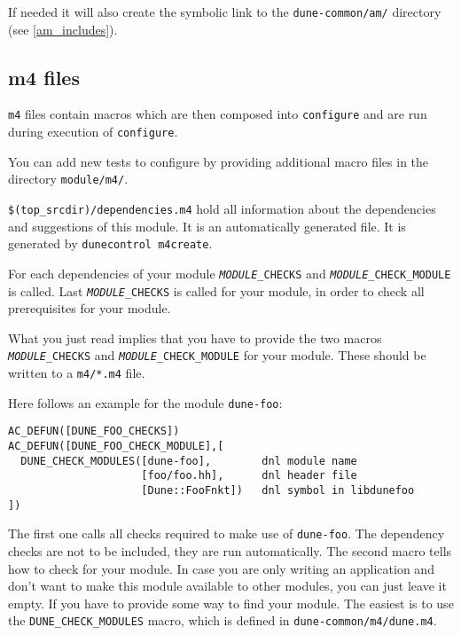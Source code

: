 \documentclass[11pt,a4paper,headinclude,footinclude,DIV16,normalheadings]{scrartcl}
\newcommand{\configure}{\texttt{configure}\xspace}
\newcommand{\topsrc}{\$(top\_srcdir)}
\begin{document}
If needed it will also create the symbolic link to the
\texttt{dune-common/am/} directory (see \ref{am_includes}).

\subsection{m4 files}
\label{m4files}

\texttt{m4} files contain macros which are then composed into
\configure and are run during execution of \configure.


You can add new tests to configure by providing additional macro files
in the directory \texttt{module/m4/}.


\texttt{\topsrc/dependencies.m4} hold all information about the
dependencies and suggestions of this module. It is an automatically
generated file. It is generated by \texttt{dunecontrol m4create}.

For each dependencies of your module \texttt{\emph{MODULE}\_CHECKS}
and \texttt{\emph{MODULE}\_CHECK\_MODULE} is called. Last
\texttt{\emph{MODULE}\_CHECKS} is called for your module, in order to
check all prerequisites for your module.

What you just read implies that you have to provide the two macros
\texttt{\emph{MODULE}\_CHECKS} and
\texttt{\emph{MODULE}\_CHECK\_MODULE} for your module. These should be
written to a \texttt{m4/*.m4} file.

Here follows an example for the module \texttt{dune-foo}:

\begin{lstlisting}
AC_DEFUN([DUNE_FOO_CHECKS])
AC_DEFUN([DUNE_FOO_CHECK_MODULE],[
  DUNE_CHECK_MODULES([dune-foo],        dnl module name
                     [foo/foo.hh],      dnl header file
                     [Dune::FooFnkt])   dnl symbol in libdunefoo
])
\end{lstlisting}

The first one calls all checks required to make use of
\texttt{dune-foo}. The dependency checks are not to be included, they
are run automatically. The second macro tells how to check for your
module. In case you are only writing an application and don't want to
make this module available to other modules, you can just leave it
empty. If you have to provide some way to find your module. The
easiest is to use the \texttt{DUNE\_CHECK\_MODULES} macro, which is
defined in \texttt{dune-common/m4/dune.m4}.
\end{document}
